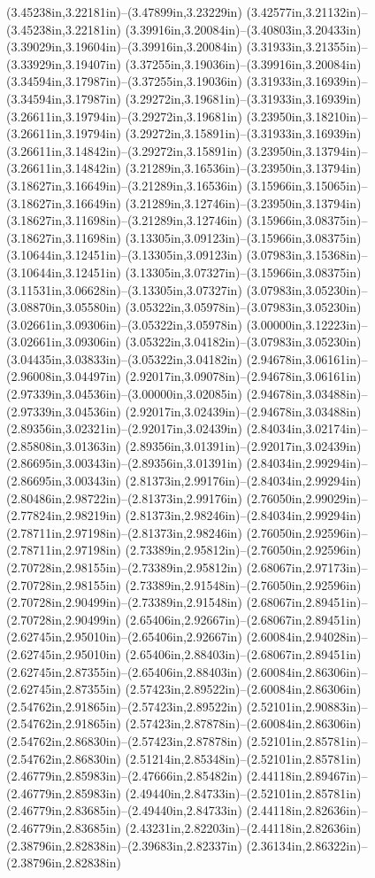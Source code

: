 (3.45238in,3.22181in)--(3.47899in,3.23229in) (3.42577in,3.21132in)--(3.45238in,3.22181in) (3.39916in,3.20084in)--(3.40803in,3.20433in) (3.39029in,3.19604in)--(3.39916in,3.20084in) (3.31933in,3.21355in)--(3.33929in,3.19407in) (3.37255in,3.19036in)--(3.39916in,3.20084in) (3.34594in,3.17987in)--(3.37255in,3.19036in) (3.31933in,3.16939in)--(3.34594in,3.17987in) (3.29272in,3.19681in)--(3.31933in,3.16939in) (3.26611in,3.19794in)--(3.29272in,3.19681in) (3.23950in,3.18210in)--(3.26611in,3.19794in) (3.29272in,3.15891in)--(3.31933in,3.16939in) (3.26611in,3.14842in)--(3.29272in,3.15891in) (3.23950in,3.13794in)--(3.26611in,3.14842in) (3.21289in,3.16536in)--(3.23950in,3.13794in) (3.18627in,3.16649in)--(3.21289in,3.16536in) (3.15966in,3.15065in)--(3.18627in,3.16649in) (3.21289in,3.12746in)--(3.23950in,3.13794in) (3.18627in,3.11698in)--(3.21289in,3.12746in) (3.15966in,3.08375in)--(3.18627in,3.11698in) (3.13305in,3.09123in)--(3.15966in,3.08375in) (3.10644in,3.12451in)--(3.13305in,3.09123in) (3.07983in,3.15368in)--(3.10644in,3.12451in) (3.13305in,3.07327in)--(3.15966in,3.08375in) (3.11531in,3.06628in)--(3.13305in,3.07327in) (3.07983in,3.05230in)--(3.08870in,3.05580in) (3.05322in,3.05978in)--(3.07983in,3.05230in) (3.02661in,3.09306in)--(3.05322in,3.05978in) (3.00000in,3.12223in)--(3.02661in,3.09306in) (3.05322in,3.04182in)--(3.07983in,3.05230in) (3.04435in,3.03833in)--(3.05322in,3.04182in) (2.94678in,3.06161in)--(2.96008in,3.04497in) (2.92017in,3.09078in)--(2.94678in,3.06161in) (2.97339in,3.04536in)--(3.00000in,3.02085in) (2.94678in,3.03488in)--(2.97339in,3.04536in) (2.92017in,3.02439in)--(2.94678in,3.03488in) (2.89356in,3.02321in)--(2.92017in,3.02439in) (2.84034in,3.02174in)--(2.85808in,3.01363in) (2.89356in,3.01391in)--(2.92017in,3.02439in) (2.86695in,3.00343in)--(2.89356in,3.01391in) (2.84034in,2.99294in)--(2.86695in,3.00343in) (2.81373in,2.99176in)--(2.84034in,2.99294in) (2.80486in,2.98722in)--(2.81373in,2.99176in) (2.76050in,2.99029in)--(2.77824in,2.98219in) (2.81373in,2.98246in)--(2.84034in,2.99294in) (2.78711in,2.97198in)--(2.81373in,2.98246in) (2.76050in,2.92596in)--(2.78711in,2.97198in) (2.73389in,2.95812in)--(2.76050in,2.92596in) (2.70728in,2.98155in)--(2.73389in,2.95812in) (2.68067in,2.97173in)--(2.70728in,2.98155in) (2.73389in,2.91548in)--(2.76050in,2.92596in) (2.70728in,2.90499in)--(2.73389in,2.91548in) (2.68067in,2.89451in)--(2.70728in,2.90499in) (2.65406in,2.92667in)--(2.68067in,2.89451in) (2.62745in,2.95010in)--(2.65406in,2.92667in) (2.60084in,2.94028in)--(2.62745in,2.95010in) (2.65406in,2.88403in)--(2.68067in,2.89451in) (2.62745in,2.87355in)--(2.65406in,2.88403in) (2.60084in,2.86306in)--(2.62745in,2.87355in) (2.57423in,2.89522in)--(2.60084in,2.86306in) (2.54762in,2.91865in)--(2.57423in,2.89522in) (2.52101in,2.90883in)--(2.54762in,2.91865in) (2.57423in,2.87878in)--(2.60084in,2.86306in) (2.54762in,2.86830in)--(2.57423in,2.87878in) (2.52101in,2.85781in)--(2.54762in,2.86830in) (2.51214in,2.85348in)--(2.52101in,2.85781in) (2.46779in,2.85983in)--(2.47666in,2.85482in) (2.44118in,2.89467in)--(2.46779in,2.85983in) (2.49440in,2.84733in)--(2.52101in,2.85781in) (2.46779in,2.83685in)--(2.49440in,2.84733in) (2.44118in,2.82636in)--(2.46779in,2.83685in) (2.43231in,2.82203in)--(2.44118in,2.82636in) (2.38796in,2.82838in)--(2.39683in,2.82337in) (2.36134in,2.86322in)--(2.38796in,2.82838in) 